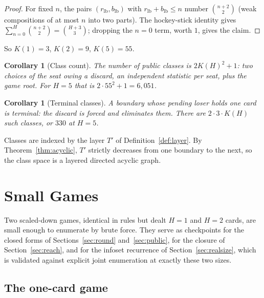 \documentclass[11pt]{article}
\theoremstyle{plain}
\newtheorem{corollary}[theorem]{Corollary}
\theoremstyle{definition}
\theoremstyle{remark}
\newcommand{\rlb}{\ensuremath{r_{\mathrm{lb}}}}
\newcommand{\blb}{\ensuremath{b_{\mathrm{lb}}}}
\begin{document}
\begin{proof}
For fixed $n$, the pairs $(\rlb,\blb)$ with $\rlb+\blb\le n$ number
$\binom{n+2}{2}$ (weak compositions of at most $n$ into two parts). The
hockey-stick identity gives
$\sum_{n=0}^{H}\binom{n+2}{2}=\binom{H+3}{3}$; dropping the $n=0$ term,
worth $1$, gives the claim.
\end{proof}

So $K(1)=3$, $K(2)=9$, $K(5)=55$.

\begin{corollary}[Class count]\label{cor:classcount}
The number of public classes is $2K(H)^2+1$: two choices of the seat owing
a discard, an independent statistic per seat, plus the game root. For
$H=5$ that is $2\cdot 55^2+1=6{,}051$.
\end{corollary}

\begin{corollary}[Terminal classes]
A boundary whose pending loser holds one card is terminal: the discard is
forced and eliminates them. There are $2\cdot 3\cdot K(H)$ such classes, or
$330$ at $H=5$.
\end{corollary}

Classes are indexed by the layer $T'$ of Definition~\ref{def:layer}. By
Theorem~\ref{thm:acyclic}, $T'$ strictly decreases from one boundary to the
next, so the class space is a layered directed acyclic graph.

\section{Small Games}\label{sec:small}

Two scaled-down games, identical in rules but dealt $H=1$ and $H=2$ cards,
are small enough to enumerate by brute force. They serve as checkpoints for
the closed forms of Sections~\ref{sec:round} and~\ref{sec:public}, for the
closure of Section~\ref{sec:reach}, and for the infoset recurrence of
Section~\ref{sec:realsize}, which is validated against explicit joint
enumeration at exactly these two sizes.

\subsection{The one-card game}
\end{document}
